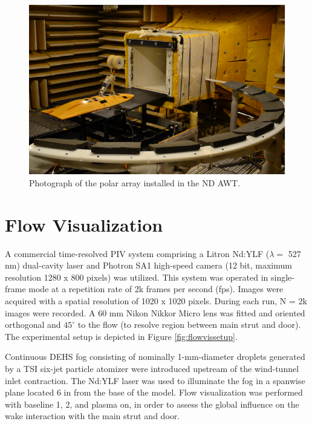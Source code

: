 \begin{figure}
	\begin{center}
		\centerline{\includegraphics[scale=1.0]{figures/arraypic}}
		\caption{Photograph of the polar array installed in the ND AWT.}
		\label{fig:arraypic}
	\end{center}
\end{figure}

\section{Flow Visualization}
A commercial time-resolved PIV system comprising a Litron Nd:YLF ($\lambda =$ 527 nm) dual-cavity laser and Photron SA1 high-speed camera (12 bit, maximum resolution 1280 x 800 pixels) was utilized. This system was operated in single-frame mode at a repetition rate of 2k frames per second (fps). Images were acquired with a spatial resolution of 1020 x 1020 pixels. During each run, N = 2k images were recorded. A 60 mm Nikon Nikkor Micro lens was fitted and oriented orthogonal and $45^\circ$ to the flow (to resolve region between main strut and door). The experimental setup is depicted in Figure \ref{fig:flowvissetup}.

Continuous DEHS fog consisting of nominally 1-mm-diameter droplets generated by a TSI six-jet particle atomizer were introduced upstream of the wind-tunnel inlet contraction. The Nd:YLF laser was used to illuminate the fog in a spanwise plane located 6 in from the base of the model. Flow visualization was performed with baseline 1, 2, and plasma on, in order to assess the global influence on the wake interaction with the main strut and door. 

